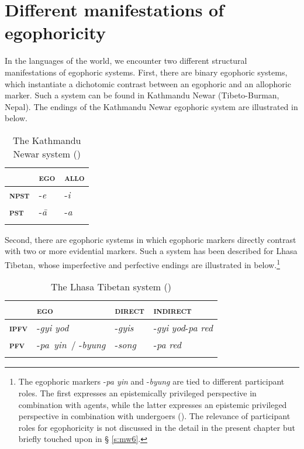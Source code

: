 \documentclass[output=paper]{langsci/langscibook}
\begin{document}
\section{Different manifestations of egophoricity}\label{s:mw3} 

In the languages of the world, we encounter two different structural manifestations of egophoric systems. First, there are binary egophoric systems, which instantiate a dichotomic contrast between an egophoric and an allophoric marker. Such a system can be found in Kathmandu Newar (Tibeto-Burman, Nepal). The endings of the Kathmandu Newar egophoric system are illustrated in  below.

\begin{table}
\begin{tabularx}{.75\textwidth}{QQQ}
\lsptoprule
& \textbf{\textsc{ego}} & \textbf{\textsc{allo}}\\
\midrule
\textbf{\textsc{npst}} & -\textit{e} & -\textit{i}\\
\textbf{\textsc{pst}} & -\textit{ā} & -\textit{a}\\
\lspbottomrule
\end{tabularx}
\caption{The Kathmandu Newar system (\citealt{Hargreaves2005})}
\label{tab:mw4}
\end{table}

Second, there are egophoric systems in which egophoric markers directly contrast with two or more evidential markers. Such a system has  been described for Lhasa Tibetan, whose imperfective and perfective endings are illustrated in  below.\footnote{The egophoric markers -\textit{pa yin} and -\textit{byung} are tied to different participant roles. The first expresses an epistemically privileged perspective in combination with agents, while the latter expresses an epistemic privileged perspective in combination with undergoers (\citealt{WidmerZuniga2017}). The relevance of participant roles for egophoricity is not discussed in the detail in the present chapter but briefly touched upon in § \ref{s:mw6}.}

\begin{table}
\begin{tabularx}{\textwidth}{QQQl}
\lsptoprule
	&	\textbf{\textsc{ego}}	&	\textbf{\textsc{direct}}	&	\textbf{\textsc{indirect}}	\\
\midrule
\textbf{\textsc{ipfv}}	&	-\textit{gyi yod}	&	-\textit{gyis}	&	-\textit{gyi} \textit{yod}-\textit{pa red}	\\
\textbf{\textsc{pfv}}	&	\mbox{-\textit{pa yin} /} -\textit{byung}	&	-\textit{song}	&	-\textit{pa red}	\\
\lspbottomrule
\end{tabularx}
\caption{The Lhasa Tibetan system (\citealt{DeLancey1990})}
\label{tab:mw5}
\end{table}
\end{document}
